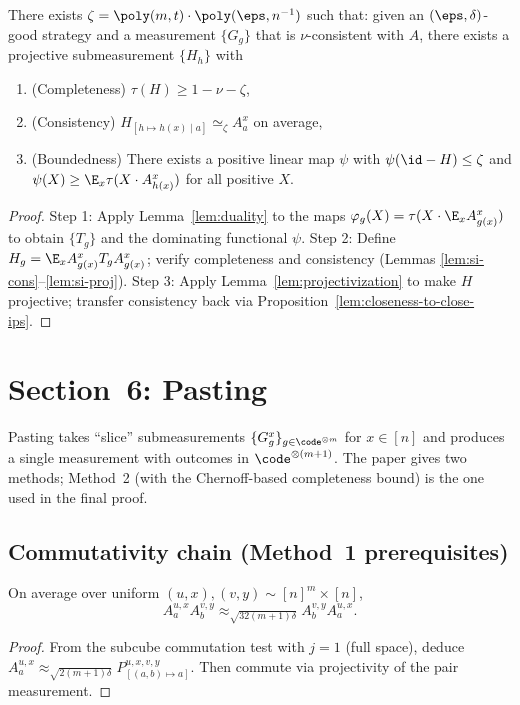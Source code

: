 \begin{lemma}\label{lem:self-improvement}
  There exists $\zeta=\poly(m,t)\cdot\poly(\eps,n^{-1})$
  such that:
  given an $(\eps,\delta)$-good strategy and a measurement $\{G_g\}$ that is
  $\nu$-consistent with $A$, there exists a projective submeasurement $\{H_h\}$ with
  \begin{enumerate}
    \item (Completeness) $\tau(H)\ge 1-\nu-\zeta$,
    \item (Consistency) $H_{[h\mapsto h(x)\mid a]}\simeq_\zeta A^x_a$ on average,
    \item (Boundedness) There exists a positive linear map $\psi$ with
      $\psi(\id-H)\le\zeta$ and
      $\psi(X)\ge\E_x\tau(X\cdot A^x_{h(x)})$ for all positive $X$.
  \end{enumerate}
\end{lemma}
\begin{proof}
  Step 1: Apply Lemma~\ref{lem:duality} to the maps
  $\varphi_g(X)=\tau(X\cdot\E_x A^x_{g(x)})$
  to obtain $\{T_g\}$ and the dominating functional $\psi$.
  Step 2: Define $H_g=\E_x A^x_{g(x)}T_g A^x_{g(x)}$; verify
  completeness and consistency (Lemmas \ref{lem:si-cons}--\ref{lem:si-proj}).
  Step 3: Apply Lemma~\ref{lem:projectivization} to make $H$ projective;
  transfer consistency back via Proposition~\ref{lem:closeness-to-close-ips}.
\end{proof}


\chapter{Section~6: Pasting}
\label{chap:pasting}

Pasting takes ``slice'' submeasurements $\{G^x_g\}_{g\in\code^{\otimes m}}$
for $x\in[n]$ and produces a single measurement with outcomes in
$\code^{\otimes(m+1)}$. The paper gives two methods; Method~2 (with the
Chernoff-based completeness bound) is the one used in the final proof.

\section{Commutativity chain (Method~1 prerequisites)}

\begin{lemma}[Commutativity of $A$'s]\label{lem:a-comm}
  On average over uniform $(u,x),(v,y)\sim[n]^m\times[n]$,
  \[
    A^{u,x}_a A^{v,y}_b\approx_{\sqrt{32(m+1)\delta}} A^{v,y}_b A^{u,x}_a.
  \]
\end{lemma}
\begin{proof}
  From the subcube commutation test with $j=1$ (full space),
  deduce $A^{u,x}_a\approx_{\sqrt{2(m+1)\delta}} P^{u,x,v,y}_{[(a,b)\mapsto a]}$.
  Then commute via projectivity of the pair measurement.
\end{proof}

